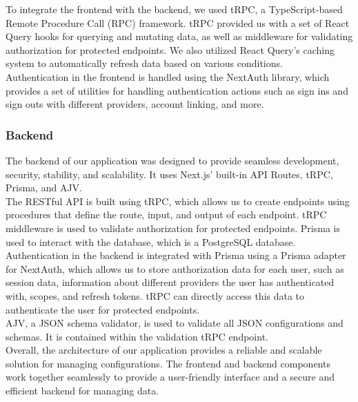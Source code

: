 \noindent
To integrate the frontend with the backend, we used tRPC, a TypeScript-based Remote Procedure Call (RPC) framework. tRPC provided us with a set of React Query hooks for querying and mutating data, as well as middleware for validating authorization for protected endpoints. We also utilized React Query's caching system to automatically refresh data based on various conditions. \\

\noindent
Authentication in the frontend is handled using the NextAuth library, which provides a set of utilities for handling authentication actions such as sign ins and sign outs with different providers, account linking, and more.

\subsubsection{Backend} 
The backend of our application was designed to provide seamless development, security, stability, and scalability. It uses Next.js' built-in API Routes, tRPC, Prisma, and AJV. \\

\noindent
The RESTful API is built using tRPC, which allows us to create endpoints using procedures that define the route, input, and output of each endpoint. tRPC middleware is used to validate authorization for protected endpoints. Prisma is used to interact with the database, which is a PostgreSQL database.\\

\noindent
Authentication in the backend is integrated with Prisma using a Prisma adapter for NextAuth, which allows us to store authorization data for each user, such as session data, information about different providers the user has authenticated with, scopes, and refresh tokens. tRPC can directly access this data to authenticate the user for protected endpoints. \\

\noindent
AJV, a JSON schema validator, is used to validate all JSON configurations and schemas. It is contained within the validation tRPC endpoint. \\

\noindent
Overall, the architecture of our application provides a reliable and scalable solution for managing configurations. The frontend and backend components work together seamlessly to provide a user-friendly interface and a secure and efficient backend for managing data.


